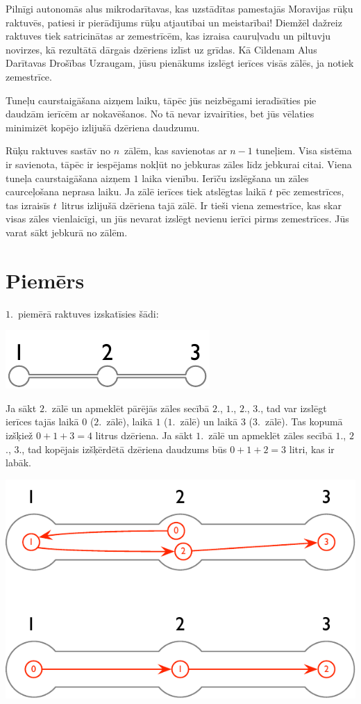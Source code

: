 
\noindent

Pilnīgi autonomās alus mikrodarītavas, kas uzstādītas pamestajās Moravijas rūķu raktuvēs, patiesi ir pierādījums rūķu atjautībai un meistarībai!
Diemžēl dažreiz raktuves tiek satricinātas ar zemestrīcēm, kas izraisa cauruļvadu un piltuvju novirzes, kā rezultātā dārgais dzēriens izlīst uz grīdas.
Kā Cildenam Alus Darītavas Drošības Uzraugam, jūsu pienākums izslēgt ierīces visās zālēs, ja notiek zemestrīce.

Tuneļu caurstaigāšana aizņem laiku, tāpēc jūs neizbēgami ieradīsīties pie daudzām ierīcēm ar nokavēšanos.
No tā nevar izvairīties, bet jūs vēlaties minimizēt kopējo izlijušā dzēriena daudzumu.

\medskip
Rūķu raktuves sastāv no $n$~zālēm, kas savienotas ar $n-1$ tuneļiem.
Visa sistēma ir savienota, tāpēc ir iespējams nokļūt no jebkuras zāles līdz jebkurai citai.
Viena tuneļa caurstaigāšana aizņem $1$ laika vienību.
Ierīču izslēgšana un zāles caurceļošana neprasa laiku.
Ja zālē ierīces tiek atslēgtas laikā $t$ pēc zemestrīces, tas izraisīs $t$~litrus izlijušā dzēriena tajā zālē.
Ir tieši viena zemestrīce, kas skar visas zāles vienlaicīgi, un jūs nevarat izslēgt nevienu ierīci pirms zemestrīces.
Jūs varat sākt jebkurā no zālēm.

\section*{Piemērs}

$1$.~piemērā raktuves izskatīsies šādi:

\includegraphics[width=.2\textwidth]{img/sample-1.pdf}

Ja sākt $2$.~zālē un apmeklēt pārējās zāles secībā $2$., $1$., $2$., $3$., tad var izslēgt ierīces tajās laikā $0$ ($2$.~zālē), laikā $1$ ($1$.~zālē) un laikā $3$ ($3$.~zālē).
Tas kopumā izšķiež $0+1+3=4$ litrus dzēriena.
Ja sākt $1$.~zālē un apmeklēt zāles secībā $1$., $2$., $3$., tad kopējais izšķērdētā dzēriena daudzums būs $0+1+2=3$ litri, kas ir labāk.

\includegraphics[width=.4\textwidth]{img/sample-1-ans.pdf}

